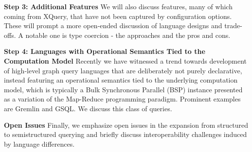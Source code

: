 \smallskip
\noindent \textbf{Step 3: Additional Features} We will also discuss features, many of which coming from XQuery, that have not been captured by configuration options. These will prompt a more open-ended discussion of language designs and trade-offs. A notable one is type coercion - the approaches and the pros and cons.

\smallskip
\noindent \textbf{Step 4: Languages with Operational Semantics Tied to the Computation Model}
Recently we have witnessed a trend towards development of high-level graph query languages that are deliberately not purely declarative, instead featuring an operational semantics tied to the
underlying computation model, which is typically a Bulk Synchronous Parallel (BSP) instance presented as a variation of the  Map-Reduce programming paradigm.
Prominent examples are Gremlin and GSQL. We discuss this class of queries.


\smallskip
\noindent \textbf{Open Issues} Finally, we emphasize open issues in the expansion from structured to semistructured querying and briefly discuss interoperability challenges induced by language differences.

